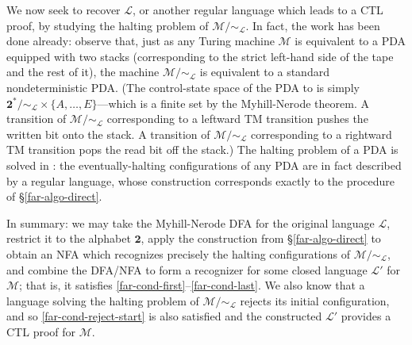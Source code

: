 We now seek to recover $\mathcal{L}$, or another regular language which leads to a CTL proof, by studying the halting problem of $\mathcal{M}/\sim_\mathcal{L}$.
In fact, the work has been done already: observe that, just as any Turing machine $\mathcal{M}$ is equivalent to a PDA equipped with two stacks (corresponding to the strict left-hand side of the tape and the rest of it), the machine $\mathcal{M}/\sim_\mathcal{L}$ is equivalent to a  standard nondeterministic PDA. (The control-state space of the PDA to is simply $\mathbf{2}^*/\sim_\mathcal{L} \times \{A,\ldots,E\}$---which is a finite set by the Myhill-Nerode theorem. A transition of $\mathcal{M}/\sim_\mathcal{L}$ corresponding to a leftward TM transition pushes the written bit onto the stack. A transition of $\mathcal{M}/\sim_\mathcal{L}$ corresponding to a rightward TM transition pops the read bit off the stack.)
The halting problem of a PDA is solved in  \cite{BEM_1997}: the eventually-halting configurations of any PDA are in fact described by a regular language, whose construction corresponds exactly to the procedure of \S\ref{far-algo-direct}.

In summary: we may take the Myhill-Nerode DFA for the original language $\mathcal{L}$, restrict it to the alphabet $\mathbf{2}$, apply the construction from \S\ref{far-algo-direct} to obtain an NFA which recognizes precisely the halting configurations of $\mathcal{M}/\sim_\mathcal{L}$, and combine the DFA/NFA to form a recognizer for some closed language $\mathcal{L}'$ for $\mathcal{M}$; that is, it satisfies \eqref{far-cond-first}--\eqref{far-cond-last}. We also know that a language solving the halting problem of $\mathcal{M}/\sim_\mathcal{L}$ rejects its initial configuration, and so \eqref{far-cond-reject-start} is also satisfied and the constructed $\mathcal{L}'$ provides a CTL proof for $\mathcal{M}$.



